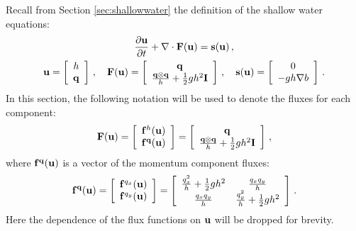Recall from Section \ref{sec:shallowwater} the definition of the shallow
water equations:
\begin{equation}
\begin{gathered}
  \ppt{\vectorsolution} + \nabla\cdot\consfluxvector
  = \conssource \eqc
\\
  \vectorsolution
    = \left[\begin{array}{c}\height\\\heightmomentum\end{array}\right]
  \eqc\quad
  \consfluxvector
  = \left[\begin{array}{c}\heightmomentum\\
      \frac{\heightmomentum\otimes\heightmomentum}{\height}
      + \half\gravity\height^2\identity
    \end{array}\right]
  \eqc\quad
  \conssource
  = \left[\begin{array}{c}0\\-\gravity\height\nabla\bathymetry\end{array}
    \right] \eqp
\end{gathered}
\end{equation}
In this section, the following notation will be used to denote the fluxes
for each component:
\[
  \consfluxvector
  = \left[\begin{array}{c}
    \mathbf{\consfluxletter}^\height(\vectorsolution)\\
    \mathbf{\consfluxletter}^\heightmomentum(\vectorsolution)
    \end{array}\right]
  = \left[\begin{array}{c}\heightmomentum\\
      \frac{\heightmomentum\otimes\heightmomentum}{\height}
      + \half\gravity\height^2\identity
    \end{array}\right] \eqc
\]
where $\mathbf{f}^{\mathbf{q}}(\mathbf{u})$ is a vector
of the momentum component fluxes:
\[
  \mathbf{f}^{\mathbf{q}}(\mathbf{u})
  = \left[\begin{array}{c}
    \mathbf{f}^{q_x}(\mathbf{u})\\
    \mathbf{f}^{q_y}(\mathbf{u})
    \end{array}\right]
  = \left[\begin{array}{c c}
    \frac{q_x^2}{h} + \frac{1}{2}gh^2
      & \frac{q_xq_y}{h}\\
    \frac{q_xq_y}{h}
      & \frac{q_y^2}{h} + \frac{1}{2}gh^2\\
    \end{array}\right] \,.
\]
Here the dependence of the flux functions on $\mathbf{u}$
will be dropped for brevity.

